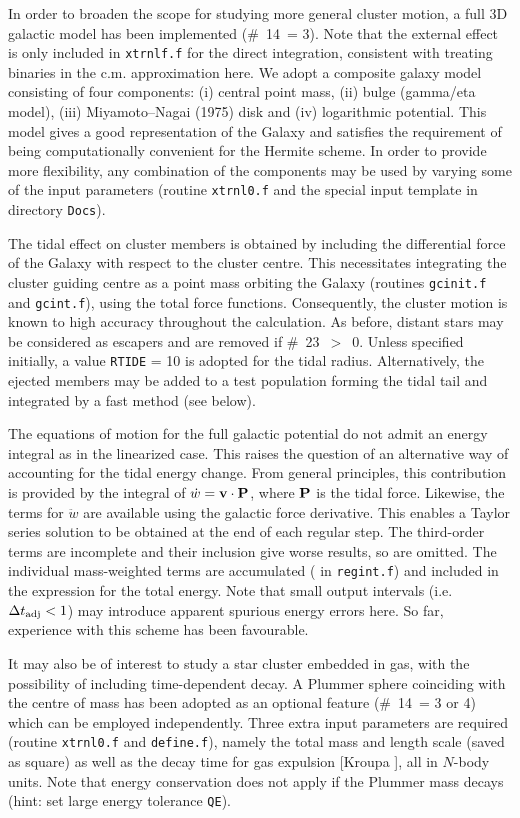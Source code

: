 \documentclass[12pt]{article}
\begin{document}
In order to broaden the scope for studying more general cluster motion, a
full 3D galactic model has been implemented (\#~14~= 3).
Note that the external effect is only included in {\tt xtrnlf.f} for the
direct integration, consistent with treating binaries in the c.m.
approximation here.
We adopt a composite galaxy model consisting of four components:
(i) central point mass, (ii) bulge (gamma/eta model), (iii) Miyamoto--Nagai
(1975) disk and (iv) logarithmic potential.
This model gives a good representation of the Galaxy and satisfies the
requirement of being computationally convenient for the Hermite scheme.
In order to provide more flexibility, any combination of the components may
be used by varying some of the input parameters (\cf routine {\tt xtrnl0.f}
and the special input template in directory {\tt Docs}).

The tidal effect on cluster members is obtained by including the
differential force of the Galaxy with respect to the cluster centre.
This necessitates integrating the cluster guiding centre as a point mass
orbiting the Galaxy (routines {\tt gcinit.f} and {\tt gcint.f}), using the
total force functions.
Consequently, the cluster motion is known to high accuracy throughout
the calculation.
As before, distant stars may be considered as escapers and are removed if
\#~23~$>$~0.
Unless specified initially, a value {\tt RTIDE} = 10 is adopted for
the tidal radius.
Alternatively, the ejected members may be added to a test population forming
the tidal tail and integrated by a fast method (see below).

The equations of motion for the full galactic potential do not admit an
energy integral as in the linearized case.
This raises the question of an alternative way of accounting for the tidal
energy change.
From general principles, this contribution is provided by the integral of
$\dot w = {\bf v} \cdot {\bf P}$, where ${\bf P}$ is the tidal force.
Likewise, the terms for ${\ddot w}$ are available using the galactic force
derivative.
This enables a Taylor series solution to be obtained at the end of each
regular step.
The third-order terms are incomplete and their inclusion give worse results,
so are omitted.
The individual mass-weighted terms are accumulated ( in
{\tt regint.f}) and included in the expression for the total energy.
Note that small output intervals (i.e. $\Delta t_{\rm adj} < 1$) may
introduce apparent spurious energy errors here.
So far, experience with this scheme has been favourable.

It may also be of interest to study a star cluster embedded in gas,
with the possibility of including time-dependent decay.
A Plummer sphere coinciding with the centre of mass has been adopted as
an optional feature (\#~14~= 3 or 4) which can be employed independently.
Three extra input parameters are required (\cf routine {\tt xtrnl0.f} and
{\tt define.f}), namely the total mass and length scale (saved as square)
as well as the decay time for gas expulsion [Kroupa ], all in
$N$-body units. Note that energy conservation does not apply if the
Plummer mass decays (hint: set large energy tolerance {\tt QE}).
\end{document}
